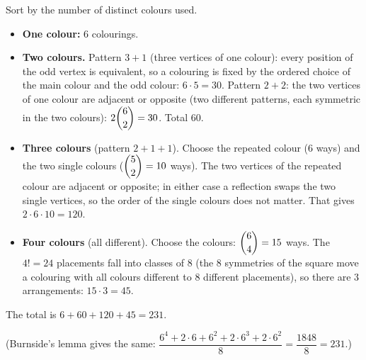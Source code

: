 Sort by the number of distinct colours used.
\begin{itemize}
\item \textbf{One colour:} $6$ colourings.
\item \textbf{Two colours.} Pattern $3+1$ (three vertices of one colour): every position of the odd vertex is equivalent, so a colouring is fixed by the ordered choice of the main colour and the odd colour: $6\cdot5=30$. Pattern $2+2$: the two vertices of one colour are adjacent or opposite (two different patterns, each symmetric in the two colours): $2\dbinom62=30$. Total $60$.
\item \textbf{Three colours} (pattern $2+1+1$). Choose the repeated colour ($6$ ways) and the two single colours ($\dbinom52=10$ ways). The two vertices of the repeated colour are adjacent or opposite; in either case a reflection swaps the two single vertices, so the order of the single colours does not matter. That gives $2\cdot6\cdot10=120$.
\item \textbf{Four colours} (all different). Choose the colours: $\dbinom64=15$ ways. The $4!=24$ placements fall into classes of $8$ (the $8$ symmetries of the square move a colouring with all colours different to $8$ different placements), so there are $3$ arrangements: $15\cdot3=45$.
\end{itemize}
The total is $6+60+120+45=\boxed{231}$.

(Burnside's lemma gives the same: $\dfrac{6^4+2\cdot6+6^2+2\cdot6^3+2\cdot6^2}{8}=\dfrac{1848}{8}=231$.)
